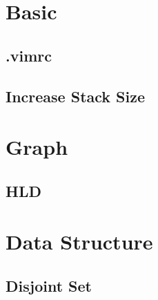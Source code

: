 \documentclass[10pt,twocolumn,oneside]{article}
\begin{document}
\newpage

\section{Basic}
\subsection{.vimrc}


\subsection{Increase Stack Size}



\section{Graph}
\subsection{HLD}


\section{Data Structure}
\subsection{Disjoint Set}

\end{document}
